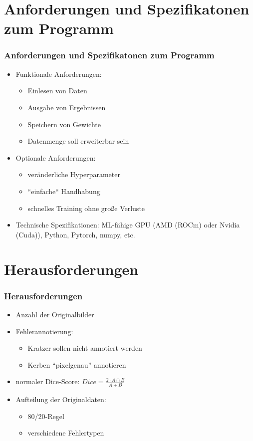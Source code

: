 \documentclass{beamer}
\begin{document}
\section{Anforderungen und Spezifikatonen zum Programm}
\begin{frame}
    \frametitle{Anforderungen und Spezifikatonen zum Programm}
    \begin{itemize}
        \item Funktionale Anforderungen:
            \begin{itemize}
                \item Einlesen von Daten
                \item Ausgabe von Ergebnissen
                \item Speichern von Gewichte
                \item Datenmenge soll erweiterbar sein
            \end{itemize}
        \item Optionale Anforderungen:
            \begin{itemize}
                \item veränderliche Hyperparameter
                \item ``einfache`` Handhabung
                \item schnelles Training ohne große Verluste
            \end{itemize}
        \item Technische Spezifikationen: 
        ML-fähige GPU (AMD (ROCm) oder Nvidia (Cuda)), 
        Python, Pytorch, numpy, etc.
    \end{itemize}
\end{frame}

\section{Herausforderungen}
\begin{frame}
\frametitle{Herausforderungen}
\begin{itemize}
    \item Anzahl der Originalbilder
    \item Fehlerannotierung:
    \begin{itemize}
        \item Kratzer sollen nicht annotiert werden
        \item Kerben ``pixelgenau'' annotieren
    \end{itemize}
    \item normaler Dice-Score:
    $Dice = \frac{2 \cdot A \cap B}{A + B}$ 
    \item Aufteilung der Originaldaten:
    \begin{itemize}
        \item 80/20-Regel
        \item verschiedene Fehlertypen
    \end{itemize}
\end{itemize}
\end{frame}
\end{document}
